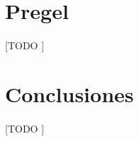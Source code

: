 \documentclass{subfiles}
\begin{document}
    \section{Pregel}
    \label{sec:pregel}

      \paragraph{}
      [TODO ]

    \section{Conclusiones}
    \label{sec:parallel_conclusions}

      \paragraph{}
      [TODO ]
\end{document}

